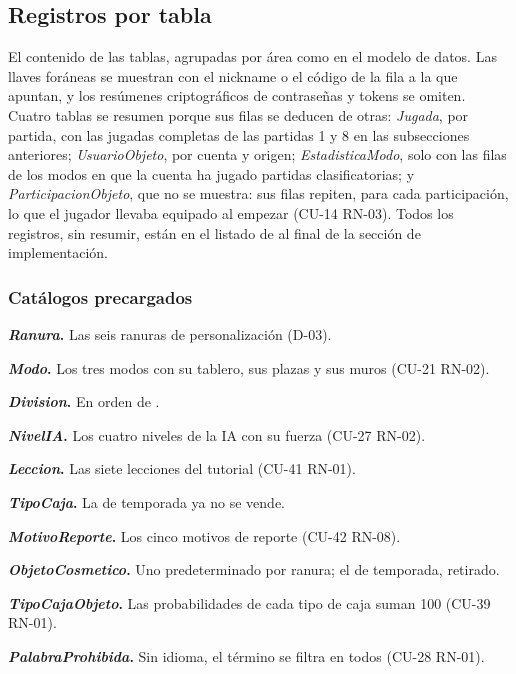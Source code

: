 \subsection*{Registros por tabla}

\newcommand{\registros}[3]{\par\needspace{6\baselineskip}\noindent\textbf{#2.} #3}

El contenido de las tablas, agrupadas por área como en el modelo de datos. Las llaves foráneas se muestran con el nickname o el código de la fila a la que apuntan, y los resúmenes criptográficos de contraseñas y tokens se omiten. Cuatro tablas se resumen porque sus filas se deducen de otras: \textit{Jugada}, por partida, con las jugadas completas de las partidas 1 y 8 en las subsecciones anteriores; \textit{UsuarioObjeto}, por cuenta y origen; \textit{EstadisticaModo}, solo con las filas de los modos en que la cuenta ha jugado partidas clasificatorias; y \textit{ParticipacionObjeto}, que no se muestra: sus filas repiten, para cada participación, lo que el jugador llevaba equipado al empezar (\mbox{CU-14} \mbox{RN-03}). Todos los registros, sin resumir, están en el listado de  al final de la sección de implementación.

\subsubsection*{Catálogos precargados}

\registros{ranura}{\textit{Ranura}}{Las seis ranuras de personalización (\mbox{D-03}).}
\registros{modo}{\textit{Modo}}{Los tres modos con su tablero, sus plazas y sus muros (\mbox{CU-21} \mbox{RN-02}).}
\registros{division}{\textit{Division}}{En orden de \at{elo\_minimo}.}
\registros{nivelia}{\textit{NivelIA}}{Los cuatro niveles de la IA con su fuerza (\mbox{CU-27} \mbox{RN-02}).}
\registros{leccion}{\textit{Leccion}}{Las siete lecciones del tutorial (\mbox{CU-41} \mbox{RN-01}).}
\registros{tipocaja}{\textit{TipoCaja}}{La de temporada ya no se vende.}
\registros{motivo}{\textit{MotivoReporte}}{Los cinco motivos de reporte (\mbox{CU-42} \mbox{RN-08}).}
\registros{objeto}{\textit{ObjetoCosmetico}}{Uno predeterminado por ranura; el de temporada, retirado.}
\registros{tipocajaobjeto}{\textit{TipoCajaObjeto}}{Las probabilidades de cada tipo de caja suman 100 (\mbox{CU-39} \mbox{RN-01}).}
\registros{palabra}{\textit{PalabraProhibida}}{Sin idioma, el término se filtra en todos (\mbox{CU-28} \mbox{RN-01}).}


